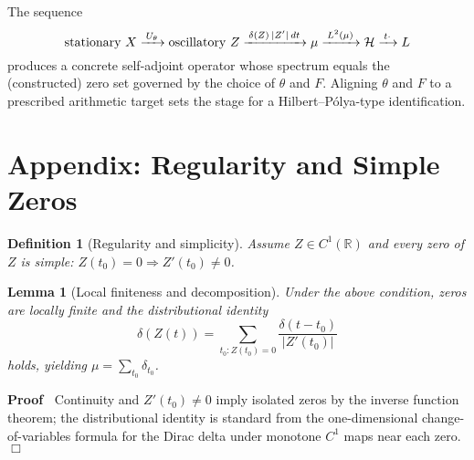 \documentclass{article}
\newenvironment{proof}{\noindent\textbf{Proof\ }}{\hspace*{\fill}$\Box$\medskip}
\newtheorem{definition}{Definition}
\newtheorem{lemma}{Lemma}
\begin{document}
\begin{remark}
   The sequence
  \begin{equation}
    \text{stationary } X \xrightarrow{\hspace{0.17em} U_{\theta}
    \hspace{0.17em}} \text{oscillatory } Z \xrightarrow{\hspace{0.17em} \delta
    (Z) \hspace{0.17em} |Z' |  \hspace{0.17em} dt \hspace{0.17em}} \mu
    \xrightarrow{\hspace{0.17em} L^2 (\mu) \hspace{0.17em}} \mathcal{H}
    \xrightarrow{\hspace{0.17em} t \cdot \hspace{0.17em}} L
  \end{equation}
  produces a concrete self-adjoint operator whose spectrum equals the
  (constructed) zero set governed by the choice of $\theta$ and $F$. Aligning
  $\theta$ and $F$ to a prescribed arithmetic target sets the stage for a
  Hilbert--P{\'o}lya-type identification.
\end{remark}

\section{Appendix: Regularity and Simple Zeros}

\begin{definition}
  [Regularity and simplicity] Assume $Z \in C^1 (\mathbb{R})$ and every zero
  of $Z$ is simple: $Z (t_0) = 0 \Longrightarrow Z' (t_0) \neq 0$.
\end{definition}

\begin{lemma}
  [Local finiteness and decomposition] Under the above condition, zeros are
  locally finite and the distributional identity
  \begin{equation}
    \delta (Z (t)) = \sum_{t_0 : Z (t_0) = 0} \frac{\delta (t - t_0)}{|Z'
    (t_0) |}
  \end{equation}
  holds, yielding $\mu = \sum_{t_0} \delta_{t_0}$.
\end{lemma}

\begin{proof}
  Continuity and $Z' (t_0) \neq 0$ imply isolated zeros by the inverse
  function theorem; the distributional identity is standard from the
  one-dimensional change-of-variables formula for the Dirac delta under
  monotone $C^1$ maps near each zero.
\end{proof}
\end{document}
